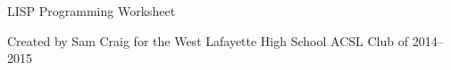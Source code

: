 \documentclass[12pt,letterpaper]{article}
\begin{document}
\begin{center}
  LISP Programming Worksheet

  Created by Sam Craig for the West Lafayette High School ACSL Club of 2014--2015
\end{center}
\end{document}

